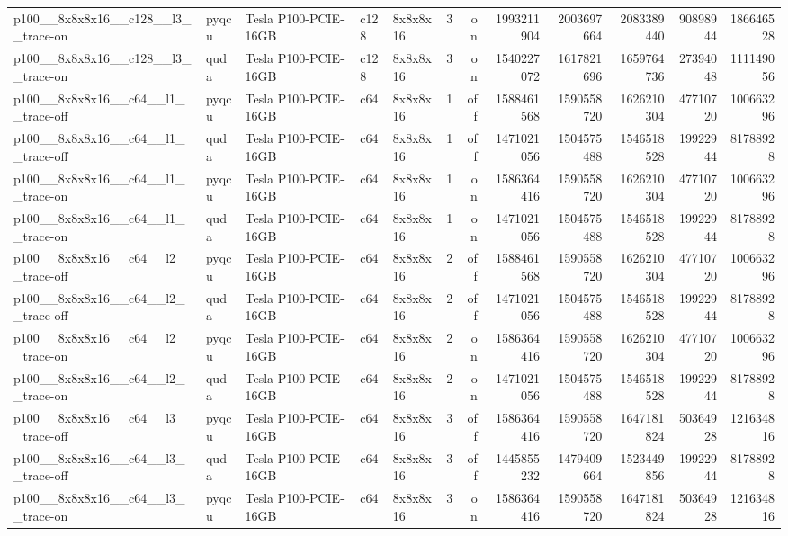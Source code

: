 \begin{table}[htbp]
\begin{tabular}{@{}lllllrrrrrrr@{}}
p100\_\_8x8x8x16\_\_c128\_\_l3\_\_trace-on & pyqcu & Tesla P100-PCIE-16GB & c128 & 8x8x8x16 & 3 & on & 1993211904 & 2003697664 & 2083389440 & 90898944 & 186646528 \\
p100\_\_8x8x8x16\_\_c128\_\_l3\_\_trace-on & quda & Tesla P100-PCIE-16GB & c128 & 8x8x8x16 & 3 & on & 1540227072 & 1617821696 & 1659764736 & 27394048 & 111149056 \\
p100\_\_8x8x8x16\_\_c64\_\_l1\_\_trace-off & pyqcu & Tesla P100-PCIE-16GB & c64 & 8x8x8x16 & 1 & off & 1588461568 & 1590558720 & 1626210304 & 47710720 & 100663296 \\
p100\_\_8x8x8x16\_\_c64\_\_l1\_\_trace-off & quda & Tesla P100-PCIE-16GB & c64 & 8x8x8x16 & 1 & off & 1471021056 & 1504575488 & 1546518528 & 19922944 & 81788928 \\
p100\_\_8x8x8x16\_\_c64\_\_l1\_\_trace-on & pyqcu & Tesla P100-PCIE-16GB & c64 & 8x8x8x16 & 1 & on & 1586364416 & 1590558720 & 1626210304 & 47710720 & 100663296 \\
p100\_\_8x8x8x16\_\_c64\_\_l1\_\_trace-on & quda & Tesla P100-PCIE-16GB & c64 & 8x8x8x16 & 1 & on & 1471021056 & 1504575488 & 1546518528 & 19922944 & 81788928 \\
p100\_\_8x8x8x16\_\_c64\_\_l2\_\_trace-off & pyqcu & Tesla P100-PCIE-16GB & c64 & 8x8x8x16 & 2 & off & 1588461568 & 1590558720 & 1626210304 & 47710720 & 100663296 \\
p100\_\_8x8x8x16\_\_c64\_\_l2\_\_trace-off & quda & Tesla P100-PCIE-16GB & c64 & 8x8x8x16 & 2 & off & 1471021056 & 1504575488 & 1546518528 & 19922944 & 81788928 \\
p100\_\_8x8x8x16\_\_c64\_\_l2\_\_trace-on & pyqcu & Tesla P100-PCIE-16GB & c64 & 8x8x8x16 & 2 & on & 1586364416 & 1590558720 & 1626210304 & 47710720 & 100663296 \\
p100\_\_8x8x8x16\_\_c64\_\_l2\_\_trace-on & quda & Tesla P100-PCIE-16GB & c64 & 8x8x8x16 & 2 & on & 1471021056 & 1504575488 & 1546518528 & 19922944 & 81788928 \\
p100\_\_8x8x8x16\_\_c64\_\_l3\_\_trace-off & pyqcu & Tesla P100-PCIE-16GB & c64 & 8x8x8x16 & 3 & off & 1586364416 & 1590558720 & 1647181824 & 50364928 & 121634816 \\
p100\_\_8x8x8x16\_\_c64\_\_l3\_\_trace-off & quda & Tesla P100-PCIE-16GB & c64 & 8x8x8x16 & 3 & off & 1445855232 & 1479409664 & 1523449856 & 19922944 & 81788928 \\
p100\_\_8x8x8x16\_\_c64\_\_l3\_\_trace-on & pyqcu & Tesla P100-PCIE-16GB & c64 & 8x8x8x16 & 3 & on & 1586364416 & 1590558720 & 1647181824 & 50364928 & 121634816 \\

\end{tabular}
\end{table}
